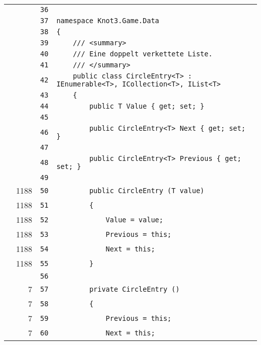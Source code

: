 \documentclass[a4paper,10pt]{article}
\begin{document}
\begin{longtable}[l]{lrrl}
\cellcolor{gray} &  & \verb~36~ & \verb~~\\
\cellcolor{gray} &  & \verb~37~ & \verb~namespace Knot3.Game.Data~\\
\cellcolor{gray} &  & \verb~38~ & \verb~{~\\
\cellcolor{gray} &  & \verb~39~ & \verb~    /// <summary>~\\
\cellcolor{gray} &  & \verb~40~ & \verb~    /// Eine doppelt verkettete Liste.~\\
\cellcolor{gray} &  & \verb~41~ & \verb~    /// </summary>~\\
\cellcolor{gray} &  & \verb~42~ & \verb~    public class CircleEntry<T> : IEnumerable<T>, ICollection<T>, IList<T>~\\
\cellcolor{gray} &  & \verb~43~ & \verb~    {~\\
\cellcolor{gray} &  & \verb~44~ & \verb~        public T Value { get; set; }~\\
\cellcolor{gray} &  & \verb~45~ & \verb~~\\
\cellcolor{gray} &  & \verb~46~ & \verb~        public CircleEntry<T> Next { get; set; }~\\
\cellcolor{gray} &  & \verb~47~ & \verb~~\\
\cellcolor{gray} &  & \verb~48~ & \verb~        public CircleEntry<T> Previous { get; set; }~\\
\cellcolor{gray} &  & \verb~49~ & \verb~~\\
\cellcolor{green} & 1188 & \verb~50~ & \verb~        public CircleEntry (T value)~\\
\cellcolor{green} & 1188 & \verb~51~ & \verb~        {~\\
\cellcolor{green} & 1188 & \verb~52~ & \verb~            Value = value;~\\
\cellcolor{green} & 1188 & \verb~53~ & \verb~            Previous = this;~\\
\cellcolor{green} & 1188 & \verb~54~ & \verb~            Next = this;~\\
\cellcolor{green} & 1188 & \verb~55~ & \verb~        }~\\
\cellcolor{gray} &  & \verb~56~ & \verb~~\\
\cellcolor{green} & 7 & \verb~57~ & \verb~        private CircleEntry ()~\\
\cellcolor{green} & 7 & \verb~58~ & \verb~        {~\\
\cellcolor{green} & 7 & \verb~59~ & \verb~            Previous = this;~\\
\cellcolor{green} & 7 & \verb~60~ & \verb~            Next = this;~\\

\end{longtable}
\end{document}
